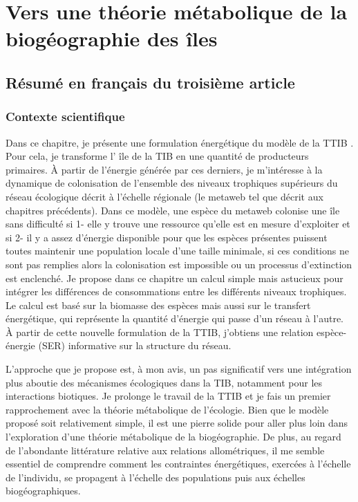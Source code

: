 \chapter{Vers une théorie métabolique de la biogéographie des îles}
\label{chap4}



\section{Résumé en français du troisième article}

\subsection{Contexte scientifique}

Dans ce chapitre, je présente une formulation énergétique du modèle
de la TTIB \citep{Gravel2011}. Pour cela, je transforme l' île de la TIB en une
quantité de producteurs primaires. À partir de l'énergie générée par ces
derniers, je m'intéresse à la dynamique de colonisation de l'ensemble des
niveaux trophiques supérieurs du réseau écologique décrit à l'échelle régionale
(le metaweb tel que décrit aux chapitres précédents). Dans ce modèle, une espèce
du metaweb colonise une île sans difficulté si 1- elle y trouve une ressource
qu'elle est en mesure d'exploiter et si 2- il y a assez d'énergie disponible
pour que les espèces présentes puissent toutes maintenir une population locale
d'une taille minimale, si ces conditions ne sont pas remplies alors la colonisation
est impossible ou un processus d'extinction est enclenché. Je propose dans ce
chapitre un calcul simple mais astucieux pour intégrer les différences de
consommations entre les différents niveaux trophiques. Le calcul est
basé sur la biomasse des espèces mais aussi sur le transfert énergétique,
qui représente la quantité d'énergie qui passe d'un réseau à l'autre. À partir
de cette nouvelle formulation de la TTIB, j'obtiens une relation espèce-énergie
(SER) informative sur la structure du réseau.

L'approche que je propose est, à mon avis, un pas significatif vers une
intégration plus aboutie des mécanismes écologiques dans la TIB, notamment pour
les interactions biotiques. Je prolonge le travail de la TTIB et
je fais un premier rapprochement avec la théorie métabolique de l'écologie.
Bien que le modèle proposé soit relativement simple, il est une pierre solide
pour aller plus loin dans l'exploration d'une théorie métabolique de la
biogéographie. De plus, au regard de l'abondante littérature relative aux
relations allométriques, il me semble essentiel de comprendre comment les
contraintes énergétiques, exercées à l'échelle de l'individu,
se propagent à l’échelle des populations puis aux échelles biogéographiques.



